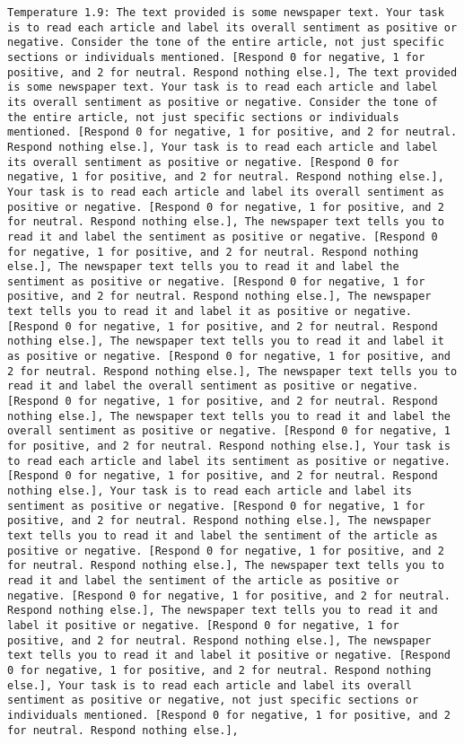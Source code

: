 \begin{lstlisting}[label=lst:poor_performing_prompts]
	Temperature 1.9: The text provided is some newspaper text. Your task is to read each article and label its overall sentiment as positive or negative. Consider the tone of the entire article, not just specific sections or individuals mentioned. [Respond 0 for negative, 1 for positive, and 2 for neutral. Respond nothing else.], The text provided is some newspaper text. Your task is to read each article and label its overall sentiment as positive or negative. Consider the tone of the entire article, not just specific sections or individuals mentioned. [Respond 0 for negative, 1 for positive, and 2 for neutral. Respond nothing else.], Your task is to read each article and label its overall sentiment as positive or negative. [Respond 0 for negative, 1 for positive, and 2 for neutral. Respond nothing else.], Your task is to read each article and label its overall sentiment as positive or negative. [Respond 0 for negative, 1 for positive, and 2 for neutral. Respond nothing else.], The newspaper text tells you to read it and label the sentiment as positive or negative. [Respond 0 for negative, 1 for positive, and 2 for neutral. Respond nothing else.], The newspaper text tells you to read it and label the sentiment as positive or negative. [Respond 0 for negative, 1 for positive, and 2 for neutral. Respond nothing else.], The newspaper text tells you to read it and label it as positive or negative. [Respond 0 for negative, 1 for positive, and 2 for neutral. Respond nothing else.], The newspaper text tells you to read it and label it as positive or negative. [Respond 0 for negative, 1 for positive, and 2 for neutral. Respond nothing else.], The newspaper text tells you to read it and label the overall sentiment as positive or negative. [Respond 0 for negative, 1 for positive, and 2 for neutral. Respond nothing else.], The newspaper text tells you to read it and label the overall sentiment as positive or negative. [Respond 0 for negative, 1 for positive, and 2 for neutral. Respond nothing else.], Your task is to read each article and label its sentiment as positive or negative. [Respond 0 for negative, 1 for positive, and 2 for neutral. Respond nothing else.], Your task is to read each article and label its sentiment as positive or negative. [Respond 0 for negative, 1 for positive, and 2 for neutral. Respond nothing else.], The newspaper text tells you to read it and label the sentiment of the article as positive or negative. [Respond 0 for negative, 1 for positive, and 2 for neutral. Respond nothing else.], The newspaper text tells you to read it and label the sentiment of the article as positive or negative. [Respond 0 for negative, 1 for positive, and 2 for neutral. Respond nothing else.], The newspaper text tells you to read it and label it positive or negative. [Respond 0 for negative, 1 for positive, and 2 for neutral. Respond nothing else.], The newspaper text tells you to read it and label it positive or negative. [Respond 0 for negative, 1 for positive, and 2 for neutral. Respond nothing else.], Your task is to read each article and label its overall sentiment as positive or negative, not just specific sections or individuals mentioned. [Respond 0 for negative, 1 for positive, and 2 for neutral. Respond nothing else.], 
\end{lstlisting}
